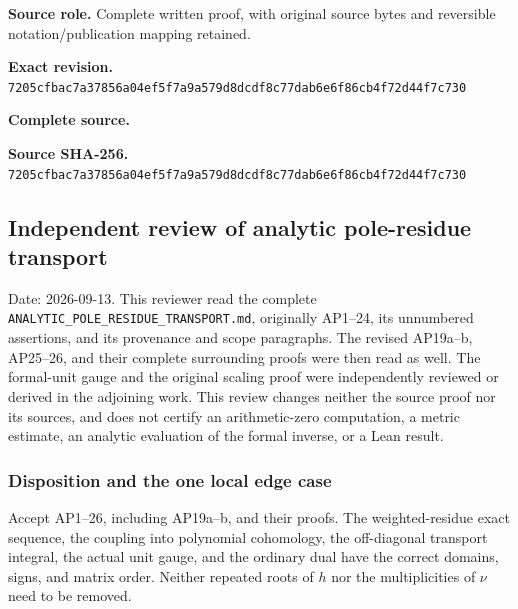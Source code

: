 \documentclass{article}
\begin{document}
\maketitle
\begingroup
\sloppy
\small

\noindent\textbf{Source role.} Complete written proof, with original source bytes and reversible notation/publication mapping retained.\par
\noindent\textbf{Exact revision.} \nolinkurl{7205cfbac7a37856a04ef5f7a9a579d8dcdf8c77dab6e6f86cb4f72d44f7c730}\par
\noindent\textbf{Complete source.} \par
\noindent\textbf{Source SHA-256.} \nolinkurl{7205cfbac7a37856a04ef5f7a9a579d8dcdf8c77dab6e6f86cb4f72d44f7c730}\par\medskip
\subsection{Independent review of analytic pole-residue transport}\label{endpoint-analytic_pole_review--independent-review-of-analytic-pole-residue-transport}

Date: 2026-09-13. This reviewer read the complete \nolinkurl{ANALYTIC_POLE_RESIDUE_TRANSPORT.md}, originally AP1--24, its unnumbered assertions, and its provenance and scope paragraphs. The revised AP19a--b, AP25--26, and their complete surrounding proofs were then read as well. The formal-unit gauge and the original scaling proof were independently reviewed or derived in the adjoining work. This review changes neither the source proof nor its sources, and does not certify an arithmetic-zero computation, a metric estimate, an analytic evaluation of the formal inverse, or a Lean result.

\subsubsection{Disposition and the one local edge case}\label{endpoint-analytic_pole_review--disposition-and-the-one-local-edge-case}

Accept AP1--26, including AP19a--b, and their proofs. The weighted-residue exact sequence, the coupling into polynomial cohomology, the off-diagonal transport integral, the actual unit gauge, and the ordinary dual have the correct domains, signs, and matrix order. Neither repeated roots of \(h\) nor the multiplicities of \(\nu\) need to be removed.
\end{document}
